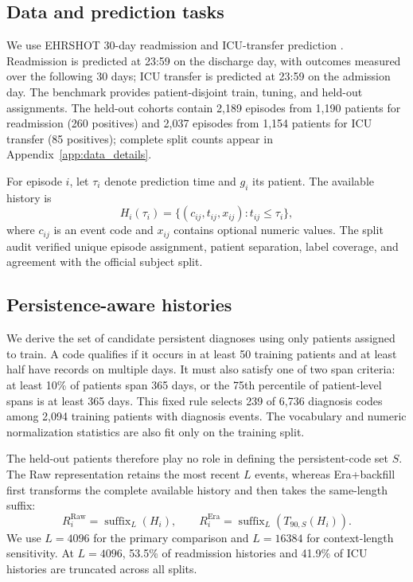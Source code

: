 \documentclass{article}
\begin{document}
\subsection{Data and prediction tasks}

We use EHRSHOT 30-day readmission and ICU-transfer prediction
\citep{wornow2023ehrshot,ehrshotrepo2026}. Readmission is predicted at 23:59 on
the discharge day, with outcomes measured over the following 30 days; ICU
transfer is predicted at 23:59 on the admission day. The benchmark provides
patient-disjoint train, tuning, and held-out assignments. The held-out cohorts
contain 2,189 episodes from 1,190 patients for readmission (260 positives) and
2,037 episodes from 1,154 patients for ICU transfer (85 positives); complete
split counts appear in Appendix~\ref{app:data_details}.

For episode $i$, let $\tau_i$ denote prediction time and $g_i$ its patient. The
available history is
\begin{equation}
H_i(\tau_i)=\{(c_{ij},t_{ij},x_{ij}):t_{ij}\leq\tau_i\},
\end{equation}
where $c_{ij}$ is an event code and $x_{ij}$ contains optional numeric values.
The split audit verified unique episode assignment, patient separation, label
coverage, and agreement with the official subject split.

\subsection{Persistence-aware histories}

We derive the set of candidate persistent diagnoses using only patients
assigned to train. A code qualifies if it occurs in at least 50 training
patients and at least half have records on multiple days. It must also satisfy
one of two span criteria: at least 10\% of patients span 365 days, or the 75th
percentile of patient-level spans is at least 365 days. This fixed rule selects
239 of 6,736 diagnosis codes among 2,094 training patients with diagnosis
events. The vocabulary and numeric normalization statistics are also fit only
on the training split.

The held-out patients therefore play no role in defining the persistent-code
set $S$. The Raw representation retains the most recent $L$ events, whereas
Era+backfill first transforms the complete available history and then takes
the same-length suffix:
\begin{equation}
R_i^{\mathrm{Raw}}=\operatorname{suffix}_L(H_i),\qquad
R_i^{\mathrm{Era}}=\operatorname{suffix}_L(T_{90,S}(H_i)).
\end{equation}
We use $L=4096$ for the primary comparison and $L=16384$ for context-length
sensitivity. At $L=4096$, 53.5\% of readmission histories and 41.9\% of ICU
histories are truncated across all splits.
\end{document}
